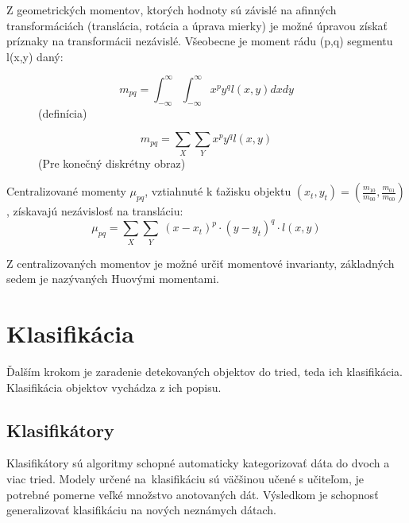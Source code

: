         Z geometrických momentov, ktorých hodnoty sú závislé na afinných transformáciách (translácia, rotácia a úprava mierky) je možné úpravou získať príznaky na transformácii nezávislé. \cite{Erbo2017} Všeobecne je moment rádu (p,q) segmentu l(x,y) daný:
        \begin{figure}[!ht]
            \begin{minipage}[b]{0.45\textwidth}
                \[
                    m_{pq} = \int_{-\infty}^\infty\int_{-\infty}^\infty x^p y^q l(x,y) dx dy
                \]
                \centering
                (definícia)
            \end{minipage}
            \begin{minipage}[b]{0.45\textwidth}
                \begin{equation}
                    m_{pq} = \sum_{X}\sum_{Y} x^p y^q l(x,y)
                \end{equation}
                \centering
                (Pre konečný diskrétny obraz)
            \end{minipage}
        \end{figure}

        Centralizované momenty $\mu_{pq}$, vztiahnuté k ťažisku objektu $(x_t,y_t) = (\frac{m_{10}}{m_{00}},\frac{m_{01}}{m_{00}})$, získavajú nezávislosť na transláciu:
        \begin{equation}\mu_{pq} = \sum_X\sum_Y\ (x-x_t)^p \cdot (y-y_t)^q \cdot l(x,y)\end{equation}

        Z centralizovaných momentov je možné určiť momentové invarianty, základných sedem je nazývaných Huovými momentami.

\chapter{Klasifikácia}

    Ďalším krokom je zaradenie detekovaných objektov do tried, teda ich klasifikácia. Klasifikácia objektov vychádza z ich popisu.

    \section{Klasifikátory}

        Klasifikátory sú algoritmy schopné automaticky kategorizovať dáta do dvoch a viac tried. Modely určené na~klasifikáciu sú väčšinou učené s učiteľom, je potrebné pomerne veľké množstvo anotovaných dát. Výsledkom je schopnosť generalizovať klasifikáciu na nových neznámych dátach.

